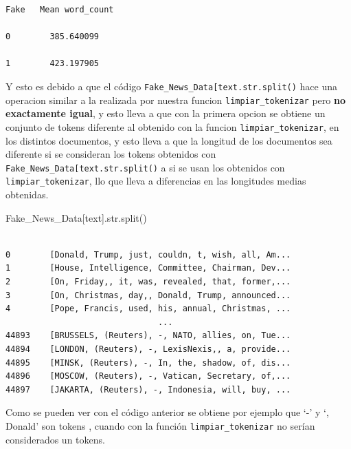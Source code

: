 \documentclass[
  11pt,
  a4paper,
]{article}
\newenvironment{Shaded}{\begin{snugshade}}{\end{snugshade}}
\newcommand{\BuiltInTok}[1]{#1}
\newcommand{\NormalTok}[1]{#1}
\newcommand{\StringTok}[1]{\textcolor[rgb]{0.31,0.60,0.02}{#1}}
\begin{document}
\begin{verbatim}
Fake   Mean word_count
    
0        385.640099
    
1        423.197905
\end{verbatim}

Y esto es debido a que el código
\texttt{Fake\_News\_Data{[}\textquotesingle{}text\textquotesingle{}{]}.str.split()}
hace una operacion similar a la realizada por nuestra funcion
\texttt{limpiar\_tokenizar} pero \textbf{no exactamente igual}, y esto
lleva a que con la primera opcion se obtiene un conjunto de tokens
diferente al obtenido con la funcion \texttt{limpiar\_tokenizar}, en los
distintos documentos, y esto lleva a que la longitud de los documentos
sea diferente si se consideran los tokens obtenidos con
\texttt{Fake\_News\_Data{[}\textquotesingle{}text\textquotesingle{}{]}.str.split()}
a si se usan los obtenidos con \texttt{limpiar\_tokenizar}, llo que
lleva a diferencias en las longitudes medias obtenidas.

\begin{Shaded}
\begin{Highlighting}[]
\NormalTok{Fake\_News\_Data[}\StringTok{\textquotesingle{}text\textquotesingle{}}\NormalTok{].}\BuiltInTok{str}\NormalTok{.split()}
\end{Highlighting}
\end{Shaded}

\begin{verbatim}

0        [Donald, Trump, just, couldn, t, wish, all, Am...
1        [House, Intelligence, Committee, Chairman, Dev...
2        [On, Friday,, it, was, revealed, that, former,...
3        [On, Christmas, day,, Donald, Trump, announced...
4        [Pope, Francis, used, his, annual, Christmas, ...
                               ...                        
44893    [BRUSSELS, (Reuters), -, NATO, allies, on, Tue...
44894    [LONDON, (Reuters), -, LexisNexis,, a, provide...
44895    [MINSK, (Reuters), -, In, the, shadow, of, dis...
44896    [MOSCOW, (Reuters), -, Vatican, Secretary, of,...
44897    [JAKARTA, (Reuters), -, Indonesia, will, buy, ...
\end{verbatim}

Como se pueden ver con el código anterior se obtiene por ejemplo que `-'
y `, Donald' son tokens , cuando con la función
\texttt{limpiar\_tokenizar} no serían considerados un tokens.

\vspace{0.5cm}
\end{document}
